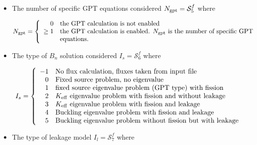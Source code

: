 \begin{itemize}
\item The number of specific GPT equations considered $N_{\rm gpt}=\mathcal{S}^{f}_{5}$ where

\begin{displaymath}
N_{\rm gpt} = \left\{
\begin{array}{rl}
 0 & \textrm{the GPT calculation is not enabled} \\
 \ge 1 & \textrm{the GPT calculation is enabled. $N_{\rm gpt}$ is the number of specific GPT} \\
  & \textrm{equations.} \\
\end{array} \right.
\end{displaymath}

\item The type of $B_n$ solution considered $I_{s}=\mathcal{S}^{f}_{6}$ where

\begin{displaymath}
I_{s} = \left\{
\begin{array}{rl}
-1 & \textrm{No flux calculation, fluxes taken from input file}\\
 0 & \textrm{Fixed source problem, no eigenvalue} \\
 1 & \textrm{fixed source eigenvalue problem (GPT type) with fission} \\
 2 & \textrm{\ensuremath{K_{\mathrm{eff}}}{} eigenvalue problem with fission and without leakage} \\
 3 & \textrm{\ensuremath{K_{\mathrm{eff}}}{} eigenvalue problem with fission and leakage } \\
 4 & \textrm{Buckling eigenvalue problem with fission and leakage} \\
 5 & \textrm{Buckling eigenvalue problem without fission but with leakage} 
\end{array} \right.
\end{displaymath}

\item The type of leakage model $I_{l}=\mathcal{S}^{f}_{7}$ where


\end{itemize}
